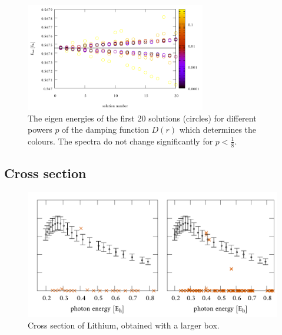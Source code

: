 \begin{figure}
\includegraphics[width=0.7\textwidth]{Figures/IFem_powers_spectra}
\caption{The eigen energies of the first 20 solutions (circles) for different powers $p$ of the damping function $D(r)$ which determines the colours.
The spectra do not change significantly for $p<\frac 18$.}
\label{fig:powerSpect}
\end{figure}

\subsection{Cross section}
\begin{figure}
\includegraphics[width=\textwidth]{Figures/Lithium/CrossSectLB}
\caption{Cross section of Lithium, obtained with a larger box.}
\label{subfig:LiCS}
\end{figure}

